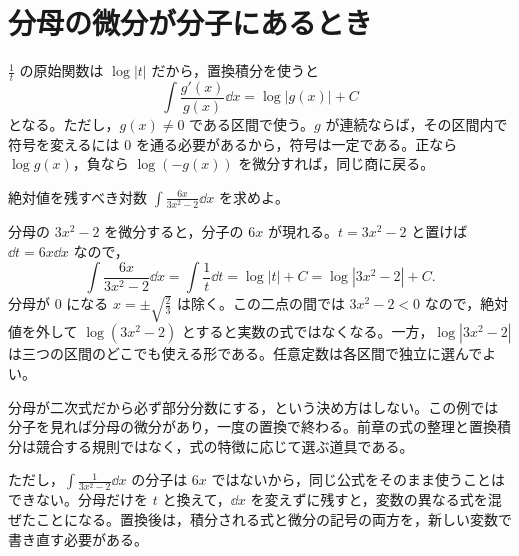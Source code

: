 \section{分母の微分が分子にあるとき}\label{節:対数型の置換}

$\frac1t$ の原始関数は $\log|t|$ だから，置換積分を使うと
\[
 \int\frac{g'(x)}{g(x)}\dd x=\log|g(x)|+C
\]
となる。ただし，$g(x)\ne0$ である区間で使う。$g$ が連続ならば，その区間内で符号を変えるには $0$ を通る必要があるから，符号は一定である。正なら $\log g(x)$，負なら $\log(-g(x))$ を微分すれば，同じ商に戻る。

\begin{example}{絶対値を残すべき対数}
$\int\frac{6x}{3x^2-2}\dd x$ を求めよ。
\end{example}

分母の $3x^2-2$ を微分すると，分子の $6x$ が現れる。$t=3x^2-2$ と置けば $\dd t=6x\dd x$ なので，
\[
 \int\frac{6x}{3x^2-2}\dd x
 =\int\frac1t\dd t
 =\log|t|+C
 =\log|3x^2-2|+C.
\]
分母が $0$ になる $x=\pm\sqrt{\frac23}$ は除く。この二点の間では $3x^2-2<0$ なので，絶対値を外して $\log(3x^2-2)$ とすると実数の式ではなくなる。一方，$\log|3x^2-2|$ は三つの区間のどこでも使える形である。任意定数は各区間で独立に選んでよい。

分母が二次式だから必ず部分分数にする，という決め方はしない。この例では分子を見れば分母の微分があり，一度の置換で終わる。前章の式の整理と置換積分は競合する規則ではなく，式の特徴に応じて選ぶ道具である。

ただし，$\int\frac1{3x^2-2}\dd x$ の分子は $6x$ ではないから，同じ公式をそのまま使うことはできない。分母だけを $t$ と換えて，$\dd x$ を変えずに残すと，変数の異なる式を混ぜたことになる。置換後は，積分される式と微分の記号の両方を，新しい変数で書き直す必要がある。

